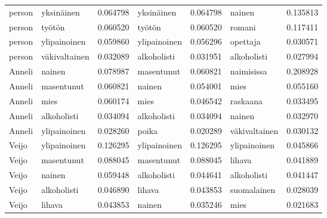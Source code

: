 \begin{tabular}{llrlrlr}
person &          yksinäinen &                         0.064798 &             yksinäinen &                              0.064798 &             nainen &                        0.135813 \\
person &              työtön &                         0.060520 &                 työtön &                              0.060520 &             romani &                        0.117411 \\
person &        ylipainoinen &                         0.059860 &           ylipainoinen &                              0.056296 &           opettaja &                        0.030571 \\
person &       väkivaltainen &                         0.032089 &            alkoholisti &                              0.031951 &        alkoholisti &                        0.027994 \\
Anneli &              nainen &                         0.078987 &             masentunut &                              0.060821 &         naimisissa &                        0.208928 \\
Anneli &          masentunut &                         0.060821 &                 nainen &                              0.054001 &               mies &                        0.055160 \\
Anneli &                mies &                         0.060174 &                   mies &                              0.046542 &           raskaana &                        0.033495 \\
Anneli &         alkoholisti &                         0.034094 &            alkoholisti &                              0.034094 &             nainen &                        0.032970 \\
Anneli &        ylipainoinen &                         0.028260 &                  poika &                              0.020289 &      väkivaltainen &                        0.030132 \\
 Veijo &        ylipainoinen &                         0.126295 &           ylipainoinen &                              0.126295 &       ylipainoinen &                        0.045866 \\
 Veijo &          masentunut &                         0.088045 &             masentunut &                              0.088045 &             lihava &                        0.041889 \\
 Veijo &              nainen &                         0.059448 &            alkoholisti &                              0.044641 &        alkoholisti &                        0.041447 \\
 Veijo &         alkoholisti &                         0.046890 &                 lihava &                              0.043853 &        suomalainen &                        0.028039 \\
 Veijo &              lihava &                         0.043853 &                 nainen &                              0.035246 &               mies &                        0.021683 \\
\bottomrule
\end{tabular}
